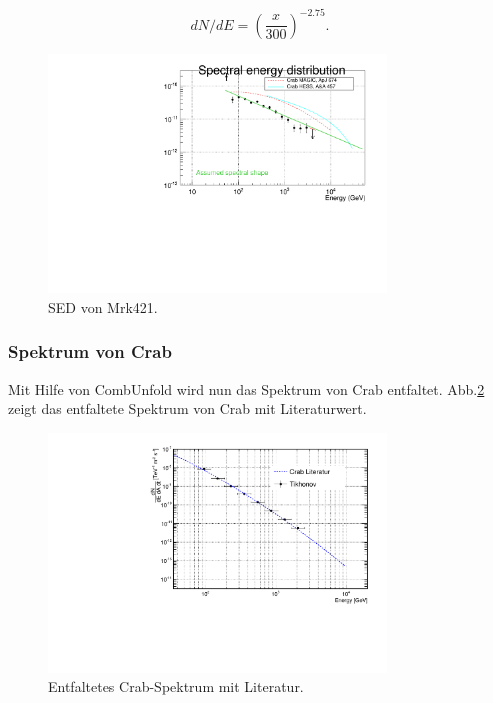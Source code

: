 \begin{equation}
dN/dE=\left(\frac{x}{300}\right)^{-2.75}.
\end{equation}


\begin{figure}
    \centering
    \includegraphics[width=0.8\textwidth]{./Plots/04_MrkAnalyse/Datenset2/SED_Mrk421.pdf}
    \caption{SED von Mrk421.}
    \label{Datenset2_SED_Mrk421}
\end{figure}


\subsubsection{Spektrum von Crab}
Mit Hilfe von CombUnfold wird nun das Spektrum von Crab entfaltet.
Abb.\ref{Datenset2_CombunFold_Crab} zeigt das entfaltete Spektrum von Crab mit Literaturwert.

\begin{figure}
    \centering
    \includegraphics[width=0.8\textwidth]{./Plots/04_MrkAnalyse/Datenset2/Crab_mit_Literatur.pdf}
    \caption{Entfaltetes Crab-Spektrum mit Literatur.}
    \label{Datenset2_CombunFold_Crab}
\end{figure}

